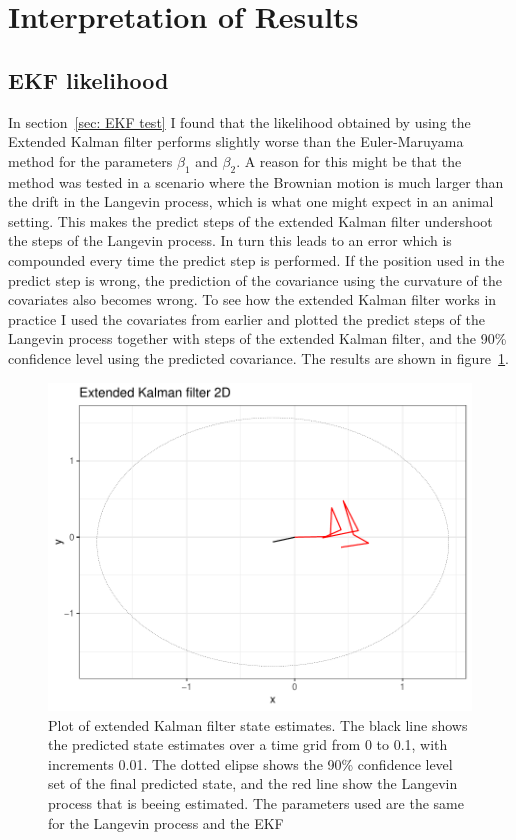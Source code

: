 

\section{Interpretation of Results}
\subsection{EKF likelihood}
 In section~\ref{sec: EKF test} I found that the likelihood obtained by using the Extended Kalman filter performs slightly worse than the Euler-Maruyama method for the parameters $\beta_1$ and $\beta_2$. A reason for this might be that the method was tested in a scenario where the Brownian motion is much larger than the drift in the Langevin process, which is what one might expect in an animal setting. This makes the predict steps of the extended Kalman filter undershoot the steps of the Langevin process. In turn this leads to an error which is compounded every time the predict step is performed. If the position used in the predict step is wrong, the prediction of the covariance using the curvature of the covariates also becomes wrong. To see how the extended Kalman filter works in practice I used the covariates from earlier and plotted the predict steps of the Langevin process together with steps of the extended Kalman filter, and the 90\% confidence level using the predicted covariance. The results are shown in figure~\ref{fig:EKF high diffusion}. 


\begin{figure}[H]
    \centering
    \includegraphics[width=\linewidth]{Images/discussion/EKF high diffusion path.pdf}
    \caption[Extended Kalman filter path]{Plot of extended Kalman filter state estimates. The black line shows the predicted state estimates over a time grid from 0 to 0.1, with increments 0.01. The dotted elipse shows the 90\% confidence level set of the final predicted state, and the red line show the Langevin process that is beeing estimated. The parameters used are the same for the Langevin process and the EKF}
    \label{fig:EKF high diffusion}
\end{figure}

